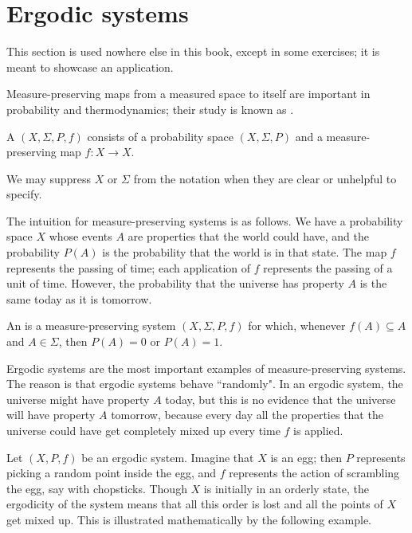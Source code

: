 \section{Ergodic systems}
This section is used nowhere else in this book, except in some exercises; it is meant to showcase an application.

Measure-preserving maps from a measured space to itself are important in probability and thermodynamics; their study is known as .

\begin{definition}
A  $(X, \Sigma, P, f)$ consists of a probability space $(X, \Sigma, P)$ and a measure-preserving map $f: X \to X$.
\end{definition}

\begin{subsec}
We may suppress $X$ or $\Sigma$ from the notation when they are clear or unhelpful to specify.
\end{subsec}

\begin{subsec}
The intuition for measure-preserving systems is as follows.
We have a probability space $X$ whose events $A$ are properties that the world could have, and the probability $P(A)$ is the probability that the world is in that state.
The map $f$ represents the passing of time; each application of $f$ represents the passing of a unit of time.
However, the probability that the universe has property $A$ is the same today as it is tomorrow.
\end{subsec}

\begin{definition}
An  is a measure-preserving system $(X, \Sigma, P, f)$ for which, whenever $f(A) \subseteq A$ and $A \in \Sigma$, then $P(A) = 0$ or $P(A) = 1$.
\end{definition}

\begin{subsec}
Ergodic systems are the most important examples of measure-preserving systems.
The reason is that ergodic systems behave ``randomly".
In an ergodic system, the universe might have property $A$ today, but this is no evidence that the universe will have property $A$ tomorrow, because every day all the properties that the universe could have get completely mixed up every time $f$ is applied.

Let $(X, P, f)$ be an ergodic system.
Imagine that $X$ is an egg; then $P$ represents picking a random point inside the egg, and $f$ represents the action of scrambling the egg, say with chopsticks.
Though $X$ is initially in an orderly state, the ergodicity of the system means that all this order is lost and all the points of $X$ get mixed up.
This is illustrated mathematically by the following example.
\end{subsec}

